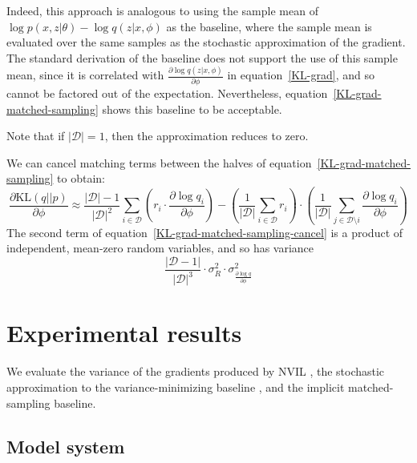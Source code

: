 \documentclass{article} %
\def\KL{\text{KL}}
\begin{document}
Indeed, this approach is analogous to using the sample mean of $\log p(x,z | \theta) - \log q(z | x, \phi)$ as the baseline, where the sample mean is evaluated over the same samples as the stochastic approximation of the gradient.  The standard derivation of the baseline does not support the use of this sample mean, since it is correlated with $\frac{\partial \log q(z | x, \phi)}{\partial \phi}$ in equation~\ref{KL-grad}, and so cannot be factored out of the expectation.  Nevertheless, equation~\ref{KL-grad-matched-sampling} shows this baseline to be acceptable.


Note that if $|\mathcal{D}| = 1$, then the approximation reduces to zero.

We can cancel matching terms between the halves of equation~\ref{KL-grad-matched-sampling} to obtain:
\begin{equation} \label{KL-grad-matched-sampling-cancel}
\frac{\partial \KL(q||p)}{\partial \phi}  \approx \frac{|\mathcal{D}| - 1}{|\mathcal{D}|^2} \sum_{i \in \mathcal{D}}\left( r_i \cdot \frac{\partial \log q_i}{\partial \phi} \right) - \left( \frac{1}{|\mathcal{D}|} \sum_{i \in \mathcal{D}} r_i \right) \cdot \left( \frac{1}{|\mathcal{D}|} \sum_{j \in \mathcal{D} \setminus i} \frac{\partial \log q_i}{\partial \phi} \right)
\end{equation}
The second term of equation~\ref{KL-grad-matched-sampling-cancel} is a product of independent, mean-zero random variables, and so has variance
\begin{equation*}
\frac{|\mathcal{D} - 1|}{|\mathcal{D}|^3} \cdot \sigma_R^2 \cdot \sigma_{\frac{\partial \log q}{\partial \phi}}^2
\end{equation*}



\section{Experimental results}

We evaluate the variance of the gradients produced by NVIL \cite{mnih2014neural}, the stochastic approximation to the variance-minimizing baseline \cite{weaver2001optimal, greensmith2004variance}, and the implicit matched-sampling baseline.

\subsection{Model system}
   
\end{document}
